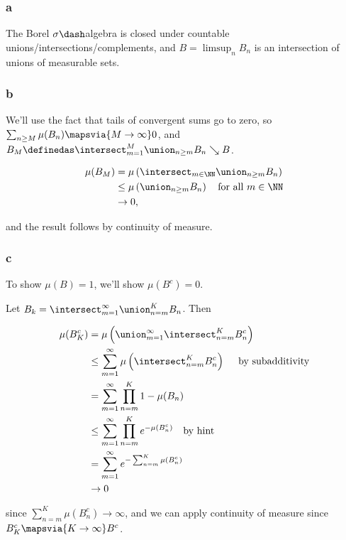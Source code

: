 \hypertarget{a-1}{%
\subsubsection{a}\label{a-1}}

The Borel \(\sigma\dash\)algebra is closed under countable
unions/intersections/complements, and \(B = \limsup_n B_n\) is an
intersection of unions of measurable sets.

\hypertarget{b-1}{%
\subsubsection{b}\label{b-1}}

We'll use the fact that tails of convergent sums go to zero, so
\(\sum_{n\geq M} \mu(B_n) \mapsvia{M\to\infty} 0\), and
\(B_M \definedas \intersect_{m = 1}^M \union_{n\geq m} B_n \searrow B\).

\begin{align*}
\mu(B_M) 
&= \mu\left(\intersect_{m\in \NN} \union_{n\geq m} B_n\right) \\
&\leq \mu\left( \union_{n\geq m} B_n \right) \quad \text{for all } m\in \NN \\
&\to 0
,\end{align*}

and the result follows by continuity of measure.

\hypertarget{c}{%
\subsubsection{c}\label{c}}

To show \(\mu(B) = 1\), we'll show \(\mu(B^c) = 0\).

Let \(B_k = \intersect_{m=1}^\infty \union_{n = m}^K B_n\). Then

\begin{align*}
\mu(B_K^c) 
&= \mu \left(\union_{m=1}^\infty \intersect_{n=m}^K B_n^c\right) \\
&\leq \sum_{m=1}^\infty \mu\left( \intersect_{n=m}^K B_n^c \right) \quad\text{ by subadditivity} \\
&= \sum_{m=1}^\infty \prod_{n=m}^K 1 - \mu(B_n) \\
&\leq \sum_{m=1}^\infty \prod_{n=m}^K e^{-\mu(B_n^c)} \quad\text{by hint} \\
&= \sum_{m=1}^\infty e^{-\sum_{n=m}^K \mu(B_n^c)} \\
&\to 0
\end{align*}

since \(\displaystyle\sum_{n=m}^K \mu(B_n^c) \to \infty\), and we can
apply continuity of measure since \(B_K^c \mapsvia{K\to\infty} B^c\).

